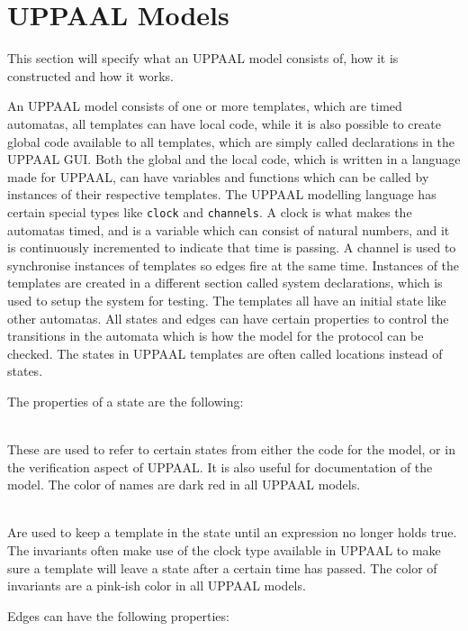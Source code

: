 \section{UPPAAL Models}
This section will specify what an UPPAAL model consists of, how it is constructed and how it works.

An UPPAAL model consists of one or more templates, which are timed automatas, all templates can have local code, while it is also possible to create global code available to all templates, which are simply called declarations in the UPPAAL GUI.
Both the global and the local code, which is written in a language made for UPPAAL, can have variables and functions which can be called by instances of their respective templates.
The UPPAAL modelling language has certain special types like \texttt{clock} and \texttt{channels}.
A clock is what makes the automatas timed, and is a variable which can consist of natural numbers, and it is continuously incremented to indicate that time is passing.
A channel is used to synchronise instances of templates so edges fire at the same time.
Instances of the templates are created in a different section called system declarations, which is used to setup the system for testing.
The templates all have an initial state like other automatas.
All states and edges can have certain properties to control the transitions in the automata which is how the model for the protocol can be checked.
The states in UPPAAL templates are often called locations instead of states.

\bigskip\noindent
The properties of a state are the following: 

\begin{description}[labelindent=\parindent]
    \item[Name]\hfill\\
    These are used to refer to certain states from either the code for the model, or in the verification aspect of UPPAAL. It is also useful for documentation of the model. The color of names are dark red in all UPPAAL models.
    \item[Invariants]\hfill\\
    Are used to keep a template in the state until an expression no longer holds true. The invariants often make use of the clock type available in UPPAAL to make sure a template will leave a state after a certain time has passed. The color of invariants are a pink-ish color in all UPPAAL models.
\end{description}

\noindent
Edges can have the following properties:

